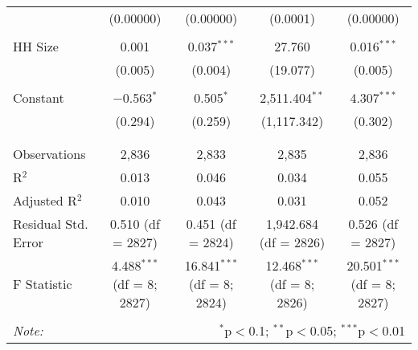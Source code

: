 \begin{table}[!htbp]
\begin{tabular}{@{\extracolsep{5pt}}lcccc}
  & (0.00000) & (0.00000) & (0.0001) & (0.00000) \\ 
  & & & & \\ 
 HH Size & 0.001 & 0.037$^{***}$ & 27.760 & 0.016$^{***}$ \\ 
  & (0.005) & (0.004) & (19.077) & (0.005) \\ 
  & & & & \\ 
 Constant & $-$0.563$^{*}$ & 0.505$^{*}$ & 2,511.404$^{**}$ & 4.307$^{***}$ \\ 
  & (0.294) & (0.259) & (1,117.342) & (0.302) \\ 
  & & & & \\ 
\hline \\[-1.8ex] 
Observations & 2,836 & 2,833 & 2,835 & 2,836 \\ 
R$^{2}$ & 0.013 & 0.046 & 0.034 & 0.055 \\ 
Adjusted R$^{2}$ & 0.010 & 0.043 & 0.031 & 0.052 \\ 
Residual Std. Error & 0.510 (df = 2827) & 0.451 (df = 2824) & 1,942.684 (df = 2826) & 0.526 (df = 2827) \\ 
F Statistic & 4.488$^{***}$ (df = 8; 2827) & 16.841$^{***}$ (df = 8; 2824) & 12.468$^{***}$ (df = 8; 2826) & 20.501$^{***}$ (df = 8; 2827) \\ 
\hline 
\hline \\[-1.8ex] 
\textit{Note:}  & \multicolumn{4}{r}{$^{*}$p$<$0.1; $^{**}$p$<$0.05; $^{***}$p$<$0.01} \\ 
\end{tabular} 
\end{table} 
